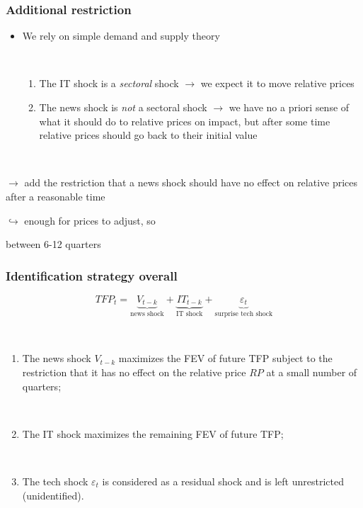 \documentclass{beamer}
\begin{document}
\begin{frame}
\frametitle{Additional restriction}


\begin{itemize}
	\item We rely on simple demand and supply theory
	
	\
	
	\begin{enumerate}
		\item The IT shock is a \emph{sectoral} shock $\rightarrow$ we expect it to move relative prices
		\item The news shock is \emph{not} a sectoral shock $\rightarrow$ we have no a priori sense of what it should do to relative prices on impact, but after some time relative prices should go back to their initial value
	\end{enumerate}
	
	\
	
\end{itemize}

	$\rightarrow$ add the restriction that a news shock should have no effect on relative prices after a reasonable time
	
\hspace{4cm} $\hookrightarrow$ enough for prices to adjust, so

\hspace{4cm}   between 6-12 quarters 


\end{frame}

\begin{frame}
	\frametitle{Identification strategy overall}

\begin{equation}
TFP_t =   \underbrace{V_{t-k}}_\text{news shock} + \underbrace{IT_{t-k}}_\text{IT shock}  + \underbrace{\varepsilon_t}_\text{surprise tech shock} 
\end{equation}

\

    \begin{enumerate}
    	\item The news shock $V_{t-k}$ maximizes the FEV of future TFP subject to the restriction that it has no effect on the relative price $RP$ at a small number of quarters;
	
	\
	
    \item The IT shock maximizes the remaining FEV of future TFP;
    
    \
    
    \item The tech shock $\varepsilon_t$ is considered as a residual shock and is left unrestricted (unidentified).
   \end{enumerate}
	
	
\end{frame}
\end{document}
